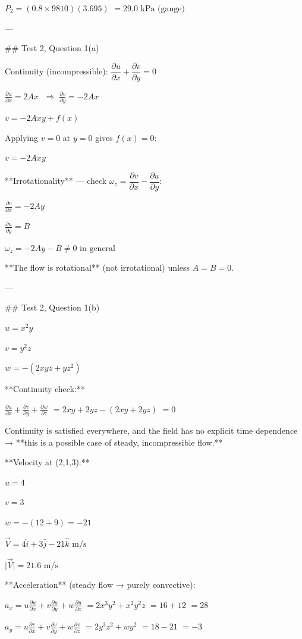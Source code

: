 $P_2 = (0.8\times9810)(3.695)$
$= \boxed{29.0\text{ kPa (gauge)}}$

---

## Test 2, Question 1(a)

Continuity (incompressible):
$\dfrac{\partial u}{\partial x}+\dfrac{\partial v}{\partial y}=0$

$\frac{\partial u}{\partial x} = 2Ax$
$\;\Rightarrow\; \frac{\partial v}{\partial y} = -2Ax$

$v = -2Axy + f(x)$

Applying $v=0$ at $y=0$ gives $f(x)=0$:

$\boxed{v = -2Axy}$

**Irrotationality** — check $\omega_z = \dfrac{\partial v}{\partial x}-\dfrac{\partial u}{\partial y}$:

$\frac{\partial v}{\partial x} = -2Ay$

$\frac{\partial u}{\partial y} = B$

$\omega_z = -2Ay - B \neq 0 \text{ in general}$

**The flow is rotational** (not irrotational) unless $A=B=0$.

---

## Test 2, Question 1(b)

$u=x^2y$

$v=y^2z$

$w=-(2xyz+yz^2)$

**Continuity check:**

$\frac{\partial u}{\partial x}+\frac{\partial v}{\partial y}+\frac{\partial w}{\partial z}$
$= 2xy + 2yz -(2xy+2yz)$
$= 0$

Continuity is satisfied everywhere, and the field has no explicit time dependence → **this is a possible case of steady, incompressible flow.**

**Velocity at (2,1,3):**

$u=4$

$v=3$

$w=-(12+9)=-21$

$\vec V = 4\hat i+3\hat j-21\hat k \text{ m/s}$

$\vert{}\vec V\vert{} = \boxed{21.6\text{ m/s}}$

**Acceleration** (steady flow → purely convective):

$a_x = u\frac{\partial u}{\partial x}+v\frac{\partial u}{\partial y}+w\frac{\partial u}{\partial z}$
$= 2x^3y^2+x^2y^2z$
$= 16+12$
$= 28$

$a_y = u\frac{\partial v}{\partial x}+v\frac{\partial v}{\partial y}+w\frac{\partial v}{\partial z}$
$= 2y^3z^2+wy^2$
$= 18-21$
$= -3$

